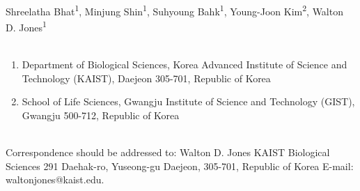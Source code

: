 Shreelatha Bhat\textsuperscript{1}, Minjung Shin\textsuperscript{1}, Suhyoung Bahk\textsuperscript{1}, Young-Joon Kim\textsuperscript{2}, Walton D. Jones\textsuperscript{1}
\\
\\
\begin{enumerate}
\item Department of Biological Sciences, Korea Advanced Institute of Science and Technology (KAIST), Daejeon 305-701, Republic of Korea
\item School of Life Sciences, Gwangju Institute of Science and Technology (GIST), Gwangju 500-712, Republic of Korea
\end{enumerate}
\\
Correspondence should be addressed to:
Walton D. Jones
KAIST Biological Sciences
291 Daehak-ro, Yuseong-gu
Daejeon, 305-701, Republic of Korea
E-mail: waltonjones@kaist.edu.